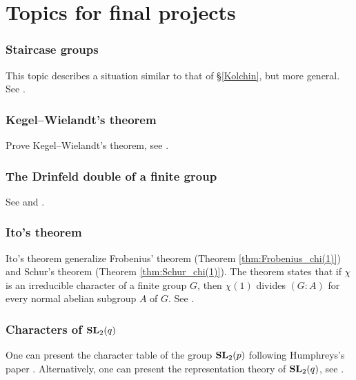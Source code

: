 \chapter*{Topics for final projects}

\pagestyle{plain}
\fancyhf{}
\fancyfoot[CE,CO]{\leftmark}
\fancyfoot[LE,RO]{\thepage}


\subsection*{Staircase groups}

This topic describes a situation similar to that of \S\ref{Kolchin}, but
more general. See \cite[Chapter 5]{MR1369573}.

\subsection*{Kegel--Wielandt's theorem}

Prove Kegel--Wielandt's theorem, see 
\cite[Theorem 2.13]{MR1211633}.

\subsection*{The Drinfeld double of a finite group}

See \cite[Chapter IX]{MR1321145} and 
\cite[Chapter 8]{MR3752618}.

\subsection*{Ito's theorem}

Ito's theorem generalize Frobenius' theorem
(Theorem \ref{thm:Frobenius_chi(1)})  
and Schur's theorem (Theorem \ref{thm:Schur_chi(1)}). 
The theorem states that if $\chi$ is an irreducible character
of a finite group $G$, then $\chi(1)$ divides 
$(G:A)$ for every normal abelian subgroup $A$ of $G$. 
See \cite[\S8.1]{MR0450380}. 

\subsection*{Characters of $\mathbf{SL}_2(q)$}

One can present the character table of the group $\mathbf{SL}_2(p)$  
following Humphreys's paper \cite{MR364478}. Alternatively, one can present
the representation theory of $\mathbf{SL}_2(q)$, see \cite[Chapter 20]{MR1650707}.

